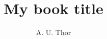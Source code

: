 \author{A. U. Thor}
\title{My book title}
\subtitle{}
\renewcommand{\lsSeries}{sidl}
\renewcommand{\lsSeriesNumber}{}
